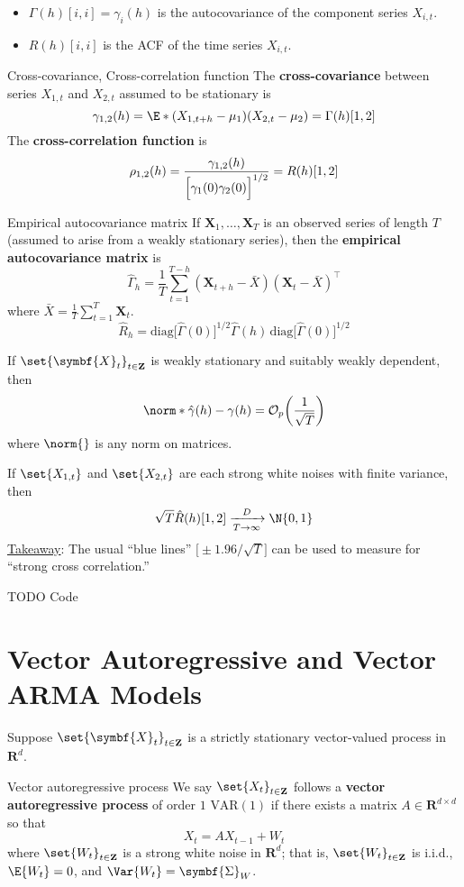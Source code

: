 \begin{Remark}{}{}
    \begin{itemize}
        \item $ \Gamma(h)[i,i]=\gamma_i(h) $ is the autocovariance of the component
              series $ X_{i,t} $.
        \item $ R(h)[i,i] $ is the ACF of the time series $ X_{i,t} $.
    \end{itemize}
\end{Remark}
\begin{Definition}{Cross-covariance, Cross-correlation function}{}
    The \textbf{cross-covariance} between series $ X_{1,t} $ and $ X_{2,t} $
    assumed to be stationary is
    \[ \gamma_{1,2}(h)=\E*{(X_{1,t+h}-\mu_1)(X_{2,t}-\mu_2)}=\Gamma(h)[1,2] \]
    The \textbf{cross-correlation function} is
    \[ \rho_{1,2}(h)=\frac{\gamma_{1,2}(h)}{\Bigl[\gamma_1(0)\gamma_2(0)\Bigr]^{1/2}}=R(h)[1,2]  \]
\end{Definition}
\begin{Definition}{Empirical autocovariance matrix}{}
    If $ \symbf{X}_1,\ldots,\symbf{X}_T $ is an observed series of length $ T $
    (assumed to arise from a weakly stationary series), then the
    \textbf{empirical autocovariance matrix} is
    \[ \hat{\Gamma}_h=\frac{1}{T} \sum_{t=1}^{T-h}(\symbf{X}_{t+h}-\bar{X})(\symbf{X}_t-\bar{X})^\top  \]
    where $ \bar{X}=\frac{1}{T} \sum_{t=1}^{T} \symbf{X}_t $.
    \[ \hat{R}_h=\text{diag}\bigl[\hat{\Gamma}(0)\bigr]^{1/2}\hat{\Gamma}(h)\, \text{diag}\bigl[\hat{\Gamma}(0)\bigr]^{1/2} \]
\end{Definition}
\begin{Theorem}{}{}
    If $ \set{\symbf{X}_t}_{t\in\mathbf{Z}} $ is weakly stationary and suitably weakly dependent,
    then
    \[ \norm*{\hat{\gamma}(h)-\gamma(h)}=\mathcal{O}_p\biggl(\frac{1}{\sqrt{T}}\biggr) \]
    where $ \norm{} $ is any norm on matrices.

    If $ \set{X_{1,t}} $ and $ \set{X_{2,t}} $ are each strong white noises with finite variance,
    then
    \[ \sqrt{T}\hat{R}(h)[1,2]\xrightarrow[T\to\infty]{D}\N{0,1} \]
    \underline{Takeaway}: The usual ``blue lines'' $ \bigl[\pm 1.96/\sqrt{T}\bigr] $
    can be used to measure for ``strong cross correlation.''
\end{Theorem}
TODO Code
\section{Vector Autoregressive and Vector ARMA Models}
Suppose $ \set{\symbf{X}_t}_{t\in\mathbf{Z}} $ is a strictly stationary
vector-valued process in $ \mathbf{R}^d $.
\begin{Definition}{Vector autoregressive process}{}
    We say $ \set{X_t}_{t\in\mathbf{Z}} $ follows a
    \textbf{vector autoregressive process} of order $ 1 $
    $ \text{VAR}(1) $ if there exists a matrix $ A\in\mathbf{R}^{d\times d} $
    so that
    \[ X_t=A X_{t-1}+W_t \]
    where $ \set{W_t}_{t\in\mathbf{Z}} $ is a strong white noise in $ \mathbf{R}^d $;
    that is, $ \set{W_t}_{t\in\mathbf{Z}} $ is i.i.d., $ \E{W_t}=0 $,
    and $ \Var{W_t}=\symbf{\Sigma}_W $.
\end{Definition}
